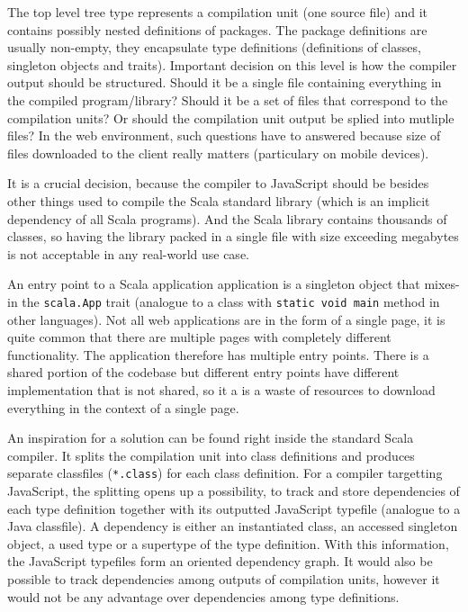 \documentclass[12pt,a4paper]{report}
\begin{document}
The top level tree type represents a compilation unit (one source file) and it contains possibly nested definitions of packages. The package definitions are usually non-empty, they encapsulate type definitions (definitions of classes, singleton objects and traits). Important decision on this level is how the compiler output should be structured. Should it be a single file containing everything in the compiled program/library? Should it be a set of files that correspond to the compilation units? Or should the compilation unit output be splied into mutliple files? In the web environment, such questions have to answered because size of files downloaded to the client really matters (particulary on mobile devices).

It is a crucial decision, because the compiler to JavaScript should be besides other things used to compile the Scala standard library \cite{ScalaLibrary} (which is an implicit dependency of all Scala programs). And the Scala library contains thousands of classes, so having the library packed in a single file with size exceeding megabytes is not acceptable in any real-world use case.

An entry point to a Scala application application is a singleton object that mixes-in the \texttt{scala.App} trait (analogue to a class with \texttt{static void main} method in other languages). Not all web applications are in the form of a single page, it is quite common that there are multiple pages with completely different functionality. The application therefore has multiple entry points. There is a shared portion of the codebase but different entry points have different implementation that is not shared, so it a is a waste of resources to download everything in the context of a single page.

An inspiration for a solution can be found right inside the standard Scala compiler. It splits the compilation unit into class definitions and produces separate classfiles (\texttt{*.class}) for each class definition. For a compiler targetting JavaScript, the splitting opens up a possibility, to track and store dependencies of each type definition together with its outputted JavaScript typefile (analogue to a Java classfile). A dependency is either an instantiated class, an accessed singleton object, a used type or a supertype of the type definition. With this information, the JavaScript typefiles form an oriented dependency graph. It would also be possible to track dependencies among outputs of compilation units, however it would not be any advantage over dependencies among type definitions.
\end{document}
